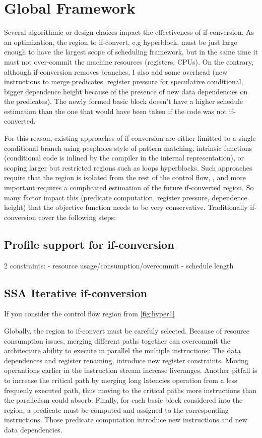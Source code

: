 \section{Global Framework}

Several algorithmic or design choices impact the effectiveness of if-conversion. As an optimization, the region to if-convert, e.g hyperblock, must be just large enough to have the largest scope of scheduling framework, but in the same time it must not over-commit the machine resources (registers, CPUs). On the contrary, although if-conversion removes branches, I also add some overhead (new instructions to merge predicates, register pressure for speculative conditional, bigger dependence height because of the presence of new data dependencies on the predicates). The newly formed basic block doesn't have a higher schedule estimation than the one that would have been taken if the code was not if-converted.

For this reason, existing approaches of if-conversion are either limitted to a single conditional branch using peepholes style of pattern matching, intrinsic functions (conditional code is inlined by the compiler in the internal representation), or scoping larger but restricted regions such as loops hyperblocks. Such approaches require that the region is isolated from the rest of the control flow, , and more important requires a complicated estimation of the future if-converted region. So many factor impact this (predicate computation, register pressure, dependence height) that the objective function needs to be very conservative. Traditionally if-conversion cover the following steps:

\subsection{Profile support for if-conversion}

2 constraints:
- resource usage/consumption/overcommit
- schedule length
\subsection{SSA Iterative if-conversion}

If you consider the control flow region from \ref{fig:hyper1} 

Globally, the region to if-convert must be carefuly selected. Because of resource consumption issues, merging different paths together can overcommit the architecture ability to execute in parallel the multiple instructions: The data dependences and register renaming, introduce new register constraints. Moving operantions earlier in the instruction stream increase liveranges. 
Another pitfall is to increase the critical path by merging long latencies operation from a less frequenly executed path, thus moving to the critical paths more instructions than the parallelism could absorb.
Finally, for each basic block considered into the region, a predicate must be computed and assigned to the corresponding instructions. Those predicate computation introduce new instructions and new data dependencies.

